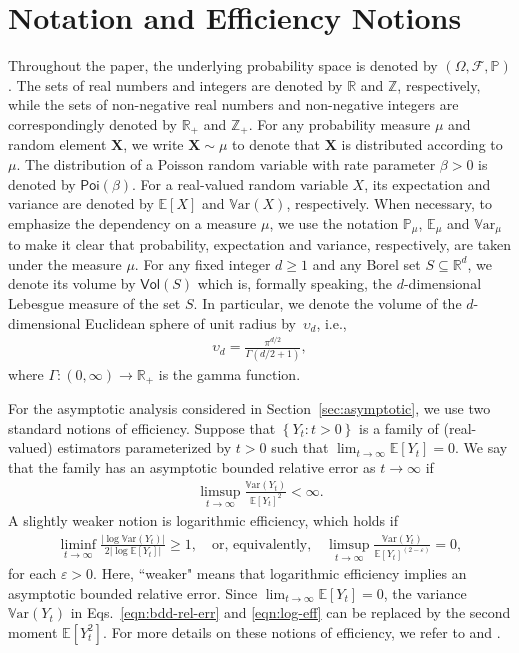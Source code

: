 \documentclass[pdflatex, sn-mathphys-ay]{sn-jnl}%
\newcommand{\reals}{\mathbb{R}}
\newcommand{\intg}{\mathbb{Z}}
\newcommand{\mscr}{\mathscr}
\renewcommand{\v}[1]{\boldsymbol{#1}}
\newcommand{\pp}{\mathbb{P}}
\newcommand{\ee}{\mathbb{E}}
\newcommand{\mX}{\v{X}}
\newcommand{\lt}{\left}
\newcommand{\rt}{\right}
\newcommand{\var}{\mathbb{V}\mathrm{ar}}
\newcommand{\vol}{\mathsf{Vol}}
\theoremstyle{thmstyleone}%
\theoremstyle{thmstyletwo}%
\theoremstyle{thmstylethree}%
\begin{document}
\section{Notation and Efficiency Notions}
\label{sec:notation}
Throughout the paper, the underlying probability space is denoted by $(\Omega, \mscr{F}, \pp)$. 
The sets of real numbers and integers are denoted by $\reals$ and $\intg$, respectively, while the sets of non-negative real numbers and non-negative integers are correspondingly denoted by $\reals_+$ and $\intg_+$. 
For any probability measure $\mu$ and random element $\mX$, we write $\mX \sim \mu$ to denote that $\mX$ is distributed according to $\mu$. The distribution of a Poisson random variable with rate parameter $\beta>0$ is denoted by $\textsf{Poi}(\beta)$.
For a real-valued random variable $X$, its expectation and variance are denoted by $\ee[X]$ and $\var(X)$, respectively. 
When necessary, to emphasize the dependency on a measure $\mu$, we use the notation $\pp_\mu$, $\ee_\mu$ and $\var_\mu$ to make it clear that  probability, expectation and variance, respectively, are taken under the  measure $\mu$. For any fixed integer $d\ge 1$ and any Borel set $S \subseteq \reals^d$, we denote its volume by $\vol(S)$ which is, formally speaking, the $d$-dimensional Lebesgue measure of the set $S$.
In particular, we denote the volume of the $d$-dimensional Euclidean sphere of unit radius by~$\upsilon_d$, i.e.,
\begin{align}
\upsilon_d =  \frac{\pi^{d/2}}{\Gamma(d/2 + 1)},
\label{eqn:unit-sphere-volume}
\end{align} 
where {  $\Gamma: (0, \infty) \to \reals_+$} is the gamma function. 

For the asymptotic analysis considered in Section~\ref{sec:asymptotic}, we use two standard notions of efficiency. Suppose that $\lt\{Y_t : t > 0\rt\}$ is a family of (real-valued) estimators parameterized by $t > 0$ such that $\lim_{t \to \infty} \ee[Y_t] = 0$.  We say that the family has an asymptotic  bounded relative error as $t \rightarrow \infty$ if 
\begin{align}
	\limsup_{t \rightarrow \infty} \frac{\var\lt(Y_t\rt)}{\ee[Y_t]^2} < \infty. \label{eqn:bdd-rel-err}
\end{align}
A slightly weaker notion is  logarithmic efficiency, which holds if 
\begin{align}
	\liminf_{t \rightarrow \infty} \frac{|\log \var\lt(Y_t\rt)|}{2 |\log \ee[Y_t] |} \geq 1,\quad
\text{or, equivalently,} \quad
    \limsup_{t \rightarrow \infty} \frac{\var\lt(Y_t\rt)}{\ee[Y_t]^{(2-\varepsilon)}} = 0, \label{eqn:log-eff}
\end{align}
for each $\varepsilon > 0$. Here, ``weaker" means that logarithmic efficiency implies an asymptotic bounded relative error. Since $\lim_{t \to \infty} \ee[Y_t] = 0$, the variance $\var\lt(Y_t\rt)$ in Eqs.~\eqref{eqn:bdd-rel-err} 
and \eqref{eqn:log-eff}
can be replaced by the second moment $\ee\lt[Y_t^2\rt]$. For more details on these notions of efficiency, we refer to \cite{AG07} and \cite{RK2017}.
\end{document}

